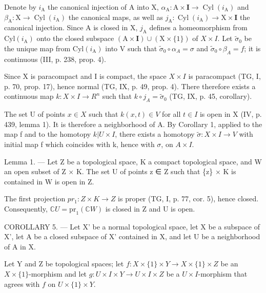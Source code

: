 Denote by \(i_{\mathrm{A}}\) the canonical injection of A into X, \(\alpha_{\mathrm{A}}: \mathrm{A} \times \mathbf{I} \to \operatorname{Cyl}(i_{\mathrm{A}})\) and \(\beta_{\mathrm{A}}: \mathrm{X} \to \operatorname{Cyl}(i_{\mathrm{A}})\) the canonical maps, as well as \(j_{\mathrm{A}}: \operatorname{Cyl}(i_{\mathrm{A}}) \to \mathrm{X} \times \mathbf{I}\) the canonical injection. Since A is closed in X, \(j_{\mathrm{A}}\) defines a homeomorphism from \(\mathrm{Cyl}(i_{\mathrm{A}})\) onto the closed subspace \((\mathrm{A}\times\mathbf{I})\cup(\mathrm{X}\times\{1\})\) of \(X\times I\). Let \(\widetilde{\sigma}_{0}\) be the unique map from \(\mathrm{Cyl}(i_{\mathrm{A}})\) into V such that \(\widetilde{\sigma}_{0}\circ\alpha_{A}=\sigma\) and \(\widetilde{\sigma}_{0}\circ\beta_{A}=f\); it is continuous (III, p. 238, prop. 4).

Since X is paracompact and I is compact, the space \(X \times I\) is paracompact (TG, I, p. 70, prop. 17), hence normal (TG, IX, p. 49, prop. 4). There therefore exists a continuous map \(k: X \times I \to R^{n}\) such that \(k \circ j_{A} = \widetilde{\sigma}_{0}\) (TG, IX, p. 45, corollary).

The set U of points \(x \in X\) such that \(k(x, t) \in V\) for all \(t \in I\) is open in X (IV, p. 439, lemma 1). It is therefore a neighborhood of A. By Corollary 1, applied to the map f and to the homotopy \(k | U \times I\), there exists a homotopy \(\widetilde{\sigma} \colon X \times I \to V\) with initial map f which coincides with k, hence with \(\sigma\), on \(A \times I\).

Lemma 1. — Let Z be a topological space, K a compact topological space, and W an open subset of Z × K. The set U of points z ∈ Z such that \{z\} × K is contained in W is open in Z.

The first projection \(pr_{1}: Z \times K \to Z\) is proper (TG, I, p. 77, cor. 5), hence closed. Consequently, \(\mathbb{C}U = \mathrm{pr}_{1}(\mathbb{C}W)\) is closed in Z and U is open.

COROLLARY 5. --- Let X' be a normal topological space, let X be a subspace of X', let A be a closed subspace of X' contained in X, and let U be a neighborhood of A in X.

Let Y and Z be topological spaces; let \(f\colon X \times \{1\} \times Y \to X \times \{1\} \times Z\) be an \(X \times \{1\}\)-morphism and let \(g\colon U \times I \times Y \to U \times I \times Z\) be a \(U \times I\)-morphism that agrees with \(f\) on \(U \times \{1\} \times Y\).

